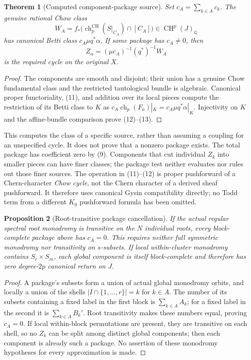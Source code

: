 \documentclass[11pt]{article}
\newtheorem{theorem}{Theorem}
\newtheorem{proposition}[theorem]{Proposition}
\newcommand{\Q}{\mathbb Q}
\newcommand{\CH}{\operatorname{CH}}
\newcommand{\ch}{\operatorname{ch}}
\begin{document}
\begin{theorem}[Computed component-package source]
Set $c_A=\sum_{k\in A}c_k$. The genuine rational Chow class
\[
 W_A=f_*\bigl(\ch_p^{\CH}(S|_{C_A})\cap[C_A]\bigr)
       \in\CH^p(J)_\Q                                \tag{12}
\]
has canonical Betti class $c_A\mu q^*\alpha$. If some package has
$c_A\ne0$, then
\[
 Z_\alpha=(\mu c_A)^{-1}(q^*)^{-1}W_A                 \tag{13}
\]
is the required cycle on the original $X$.
\end{theorem}
\begin{proof}
The components are smooth and disjoint; their union has a genuine Chow
fundamental class and the restricted tautological bundle is algebraic.
Canonical proper functoriality, (11), and addition over its local pieces
compute the restriction of its Betti class to $K$ as
$c_A\ch_p(F_a)|_K=c_A\mu q^*\alpha|_K$.
Injectivity on $K$ and the affine-bundle comparison prove (12)--(13).
\end{proof}

This computes the class of a specific source, rather than assuming a
coupling for an unspecified cycle. It does not prove that a nonzero package
exists. The total package has coefficient zero by (9). Components that cut
individual $Z_k$ into smaller pieces can have finer classes; the package
test neither evaluates nor rules out those finer sources.
The operation in (11)--(12) is proper pushforward of a Chern-character
\emph{Chow cycle}, not the Chern character of a derived sheaf pushforward.
It therefore uses canonical Gysin compatibility directly; no Todd term
from a different $K_0$ pushforward formula has been omitted.

\begin{proposition}[Root-transitive package cancellation]
If the actual regular spectral root monodromy is transitive on the $N$
individual roots, every block-complete package above has $c_A=0$.
This requires neither full symmetric monodromy nor transitivity on
$s$-subsets. If local within-cluster monodromy contains
$S_r\times S_m$, each global component is itself block-complete and
therefore has zero degree-$2p$ canonical return on $J$.
\end{proposition}
\begin{proof}
A package's subsets form a union of actual global monodromy orbits, and
locally a union of the shells $|I\cap\{1,\ldots,r\}|=k$ for $k\in A$.
The number of its subsets containing a fixed label in the first block is
$\sum_{k\in A}A_k$; for a fixed label in the second it is
$\sum_{k\in A}B_k'$. Root transitivity makes these numbers equal, proving
$c_A=0$. If local within-block permutations are present, they are
transitive on each shell, so no $Z_k$ can be split among distinct global
components; then each component is already such a package. No assertion
of these monodromy hypotheses for every approximation is made.
\end{proof}
\end{document}
